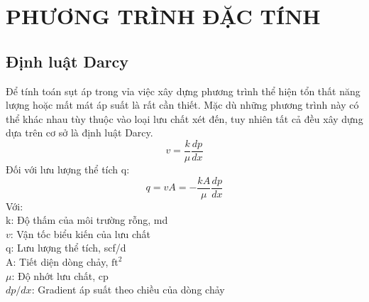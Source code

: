 \documentclass[12pt,a4paper]{report}
\begin{document}
\chapter{PHƯƠNG TRÌNH ĐẶC TÍNH}
\section{Định luật Darcy}
Để tính toán sụt áp trong vỉa việc xây dựng phương trình thể hiện tổn thất năng lượng hoặc mất mát áp suất là rất cần thiết. Mặc dù những phương trình này có thể khác nhau tùy thuộc vào loại lưu chất xét đến, tuy nhiên tất cả đều xây dựng dựa trên cơ sở là định luật Darcy.
	\begin{equation}
		v = \dfrac{k}{\mu}\dfrac{dp}{dx}
	\end{equation}
Đối với lưu lượng thể tích q:
	\begin{equation}\label{eqn:2}
		q = vA = -\dfrac{kA}{\mu}\dfrac{dp}{dx}
	\end{equation}
Với:\\
\hspace*{1cm}k: Độ thấm của môi trường rỗng, md\\
\hspace*{1cm}$v$: Vận tốc biểu kiến của lưu chất\\
\hspace*{1cm}q: Lưu lượng thể tích, scf/d\\
\hspace*{1cm}A: Tiết diện dòng chảy, $\text{ft}^2$\\
\hspace*{1cm}$\mu$: Độ nhớt lưu chất, cp\\
\hspace*{1cm}$dp/dx$: Gradient áp suất theo chiều của dòng chảy\\
\end{document}
